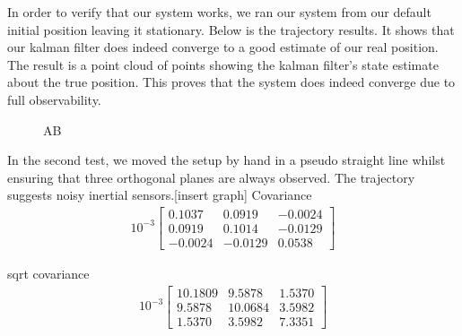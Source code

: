 \documentclass[]{article}
\begin{document}
{In order to verify that our system works, we ran our system from our default initial position leaving it stationary. Below is the trajectory results. It shows that our kalman filter does indeed converge to a good estimate of our real position. The result is a point cloud of points showing the kalman filter's state estimate about the true position. This proves that the system does indeed converge due to full observability. 
\begin{figure}[H]
	\centering     %
	\;
	\caption{AB}
	\label{fig:AB}
\end{figure}

In the second test, we moved the setup by hand in a pseudo straight line whilst ensuring that three orthogonal planes are always observed. The trajectory suggests noisy inertial sensors.[insert graph] 
Covariance
\begin{align}
	10^{-3}
	\left[
	\begin{matrix}
		0.1037	& 0.0919	& -0.0024 \\
		0.0919	& 0.1014	& -0.0129 \\
		-0.0024	& -0.0129	& 0.0538
	\end{matrix}
	\right]
\end{align}

sqrt covariance
\begin{align}
	10^{-3}
	\left[
	\begin{matrix}
		10.1809	& 9.5878	& 1.5370 \\
		9.5878	& 10.0684	& 3.5982 \\
		1.5370	& 3.5982	& 7.3351
	\end{matrix}
	\right]
\end{align}
}
\end{document}

